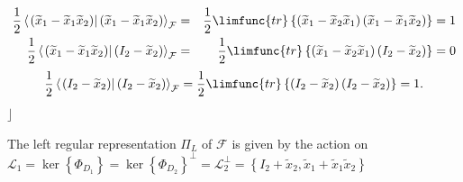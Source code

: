 \documentclass[aps,preprint]{revtex4}
\begin{document}
\begin{eqnarray}
\frac{1}{2}\left\langle \left. \left( \widetilde{x}_{1}-\widetilde{x}_{1}%
\widetilde{x}_{2}\right) \right\vert \left( \widetilde{x}_{1}-\widetilde{x}%
_{1}\widetilde{x}_{2}\right) \right\rangle _{\mathcal{F}} &=&\frac{1}{2}%
\limfunc{tr}\left\{ \left( \widetilde{x}_{1}-\widetilde{x}_{2}\widetilde{x}%
_{1}\right) \left( \widetilde{x}_{1}-\widetilde{x}_{1}\widetilde{x}%
_{2}\right) \right\} =1 \\
\frac{1}{2}\left\langle \left. \left( \widetilde{x}_{1}-\widetilde{x}_{1}%
\widetilde{x}_{2}\right) \right\vert \left( I_{2}-\widetilde{x}_{2}\right)
\right\rangle _{\mathcal{F}} &=&\frac{1}{2}\limfunc{tr}\left\{ \left( 
\widetilde{x}_{1}-\widetilde{x}_{2}\widetilde{x}_{1}\right) \left( I_{2}-%
\widetilde{x}_{2}\right) \right\} =0
\end{eqnarray}%
\begin{equation}
\frac{1}{2}\left\langle \left. \left( I_{2}-\widetilde{x}_{2}\right)
\right\vert \left( I_{2}-\widetilde{x}_{2}\right) \right\rangle _{\mathcal{F}%
}=\frac{1}{2}\limfunc{tr}\left\{ \left( I_{2}-\widetilde{x}_{2}\right)
\left( I_{2}-\widetilde{x}_{2}\right) \right\} =1.
\end{equation}%
$\rfloor $

The left regular representation $\Pi _{L}$ of $\mathcal{F}$ is given by the
action on $\mathcal{L}_{1}=\ker \left\{ \Phi _{D_{1}}\right\} =\ker \left\{
\Phi _{D_{2}}\right\} ^{\bot }=\mathcal{L}_{2}^{\bot }=\left\{ I_{2}+%
\widetilde{x}_{2},\widetilde{x}_{1}+\widetilde{x}_{1}\widetilde{x}%
_{2}\right\} $
\end{document}
